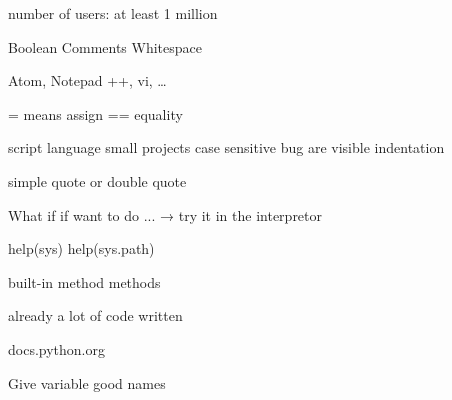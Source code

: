 number of users: at least 1 million



Boolean
Comments
Whitespace




Atom, Notepad ++, vi, \ldots 

 






= means assign 
== equality



script language
small projects
case sensitive
bug are visible
indentation

simple quote or double quote

What if if want to do ... → try it in the interpretor

help(sys)
help(sys.path)

built-in method methods

already a lot of code written


docs.python.org 


Give variable good names
